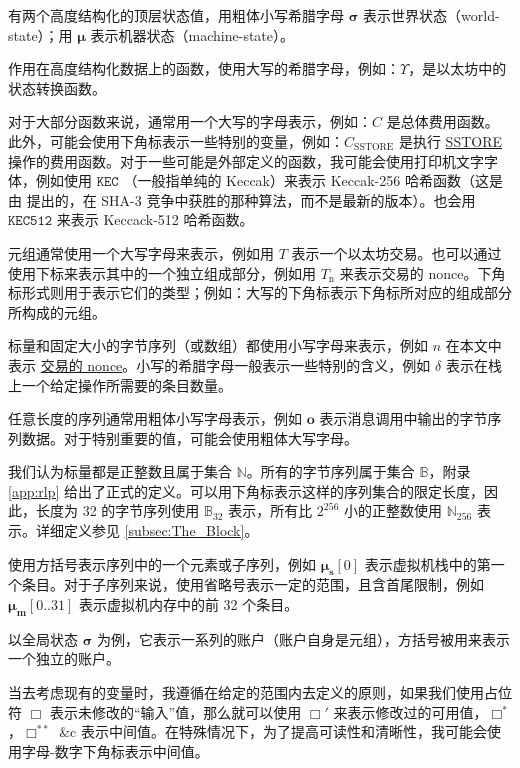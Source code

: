 \documentclass[9pt,oneside]{amsart}
\begin{document}
\begin{multicols}{2}
有两个高度结构化的顶层状态值，用粗体小写希腊字母 $\boldsymbol{\sigma}$ 表示世界状态（world-state）；用 $\boldsymbol{\mu}$ 表示机器状态（machine-state）。

作用在高度结构化数据上的函数，使用大写的希腊字母，例如：\hyperlink{Upsilon_state_transition}{$\Upsilon$}，是以太坊中的状态转换函数。

对于大部分函数来说，通常用一个大写的字母表示，例如：$C$ 是总体费用函数。此外，可能会使用下角标表示一些特别的变量，例如：\hyperlink{C__SSTORE}{$C_\text{SSTORE}$} 是执行 \hyperlink{SSTORE}{{\tiny SSTORE}} 操作的费用函数。对于一些可能是外部定义的函数，我可能会使用打印机文字字体，例如使用 $\texttt{KEC}$ （一般指单纯的 Keccak）来表示 Keccak-256 哈希函数（这是由 \cite{Keccak} 提出的，在 SHA-3 竞争中获胜的那种算法，而不是最新的版本）。也会用 $\texttt{KEC512}$ 来表示 Keccack-512 哈希函数。

元组通常使用一个大写字母来表示，例如用 $T$ 表示一个以太坊交易。也可以通过使用下标来表示其中的一个独立组成部分，例如用 \hyperlink{transaction_nonce}{$T_{\mathrm{n}}$} 来表示交易的 nonce。下角标形式则用于表示它们的类型；例如：大写的下角标表示下角标所对应的组成部分所构成的元组。

标量和固定大小的字节序列（或数组）都使用小写字母来表示，例如 $n$ 在本文中表示 \hyperlink{transaction_nonce}{交易的 nonce}。小写的希腊字母一般表示一些特别的含义，例如 $\delta$ 表示在栈上一个给定操作所需要的条目数量。

任意长度的序列通常用粗体小写字母表示，例如 $\mathbf{o}$ 表示消息调用中输出的字节序列数据。对于特别重要的值，可能会使用粗体大写字母。

我们认为标量都是正整数且属于集合 $\mathbb{N}$。所有的字节序列属于集合 $\mathbb{B}$，附录 \ref{app:rlp} 给出了正式的定义。可以用下角标表示这样的序列集合的限定长度，因此，长度为 32 的字节序列使用 $\mathbb{B}_{32}$ 表示，所有比 $2^{256}$ 小的正整数使用 $\mathbb{N}_{256}$ 表示。详细定义参见 \hyperlink{block}{\ref{subsec:The_Block}}。

使用方括号表示序列中的一个元素或子序列，例如 $\boldsymbol{\mu}_\mathbf{s}[0]$ 表示虚拟机栈中的第一个条目。对于子序列来说，使用省略号表示一定的范围，且含首尾限制，例如 $\boldsymbol{\mu}_\mathbf{m}[0..31]$ 表示虚拟机内存中的前 32 个条目。

以全局状态 $\boldsymbol{\sigma}$ 为例，它表示一系列的账户（账户自身是元组），方括号被用来表示一个独立的账户。

当去考虑现有的变量时，我遵循在给定的范围内去定义的原则，如果我们使用占位符 $\Box$ 表示未修改的“输入”值，那么就可以使用 $\Box'$ 来表示修改过的可用值，$\Box^*$，$\Box^{**}$ \&c 表示中间值。在特殊情况下，为了提高可读性和清晰性，我可能会使用字母-数字下角标表示中间值。


\end{multicols}
\end{document}
